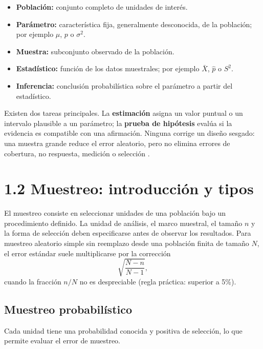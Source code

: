 \begin{itemize}
  \item \textbf{Población:} conjunto completo de unidades de interés.
  \item \textbf{Parámetro:} característica fija, generalmente desconocida, de la población; por ejemplo $\mu$, $p$ o $\sigma^2$.
  \item \textbf{Muestra:} subconjunto observado de la población.
  \item \textbf{Estadístico:} función de los datos muestrales; por ejemplo $\bar X$, $\hat p$ o $S^2$.
  \item \textbf{Inferencia:} conclusión probabilística sobre el parámetro a partir del estadístico.
\end{itemize}

Existen dos tareas principales. La \textbf{estimación} asigna un valor puntual o un intervalo plausible a un parámetro; la \textbf{prueba de hipótesis} evalúa si la evidencia es compatible con una afirmación. Ninguna corrige un diseño sesgado: una muestra grande reduce el error aleatorio, pero no elimina errores de cobertura, no respuesta, medición o selección \citep{devore2016}.

\section{1.2 Muestreo: introducción y tipos}
El muestreo consiste en seleccionar unidades de una población bajo un procedimiento definido. La unidad de análisis, el marco muestral, el tamaño $n$ y la forma de selección deben especificarse antes de observar los resultados. Para muestreo aleatorio simple sin reemplazo desde una población finita de tamaño $N$, el error estándar suele multiplicarse por la corrección
\[
  \sqrt{\frac{N-n}{N-1}},
\]
cuando la fracción $n/N$ no es despreciable (regla práctica: superior a 5\%).

\subsection*{Muestreo probabilístico}
Cada unidad tiene una probabilidad conocida y positiva de selección, lo que permite evaluar el error de muestreo.

